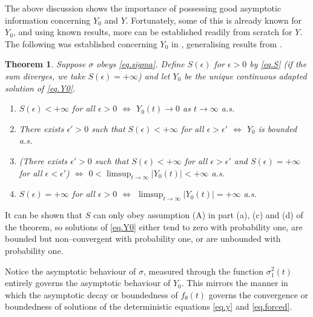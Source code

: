\documentclass[a4paper,10pt,reqno]{amsart}
\numberwithin{equation}{section}
\newtheorem{theorem}{Theorem}
\theoremstyle{definition}
\theoremstyle{remark}
\DeclareMathOperator{\1}{\mathbbm 1}
\begin{document}
The above discussion shows the importance of possessing good asymptotic information concerning $Y_0$ and $Y$. Fortunately, some of this is already known for $Y_0$, and using known results, more can be established readily from scratch for $Y$. The following was established concerning $Y_0$ in \cite{ACR:2011(DCDS)}, generalising results from \cite{ChanWilliams:1989}.
\begin{theorem}\label{thm.Y0asy}
Suppose $\sigma$ obeys \eqref{eq.sigma}. Define $S(\epsilon)$ for $\epsilon>0$ by \eqref{eq.S} (if the sum  diverges, we take $S(\epsilon)=+\infty$)
and let $Y_0$ be the unique continuous adapted solution of \eqref{eq.Y0}. 
\begin{enumerate}
	\item[(a)] $S(\epsilon)<+\infty$ for all $\epsilon>0$ $\Longleftrightarrow$ $Y_0(t)\to 0$ as $t\to\infty$ a.s.
	\item[(b)] There exists $\epsilon'>0$ such that $S(\epsilon)<+\infty$ for all $\epsilon>\epsilon'$ 
	$\Longleftrightarrow$ $Y_0$ is bounded a.s. 
	\item[(c)] (There exists $\epsilon'>0$ such that $S(\epsilon)<+\infty$ for all $\epsilon>\epsilon'$ and $S(\epsilon)=+\infty$ for all $\epsilon<\epsilon'$)  $\Longleftrightarrow$ $0<\limsup_{t\to\infty} |Y_0(t)|<+\infty$ a.s. 
	\item[(d)] $S(\epsilon)=+\infty$ for all $\epsilon>0$  $\Longleftrightarrow$ $\limsup_{t\to\infty} |Y_0(t)|=+\infty$ a.s. 
\end{enumerate}
\end{theorem}
It can be shown that $S$ can only obey assumption (A) in part (a), (c) and (d) of the theorem, so solutions of \eqref{eq.Y0} either tend to zero with probability one, are bounded but non--convergent with probability one, or are unbounded with probability one.  

Notice the asymptotic behaviour of $\sigma$, measured through the function $\sigma^2_1(t)$ entirely governs the asymptotic behaviour of $Y_0$.
This mirrors the manner in which the asymptotic decay or boundedness of $f_\theta(t)$ governs the convergence or boundedness of solutions of the deterministic equations \eqref{eq.y} and \eqref{eq.forced}.   
\end{document}
